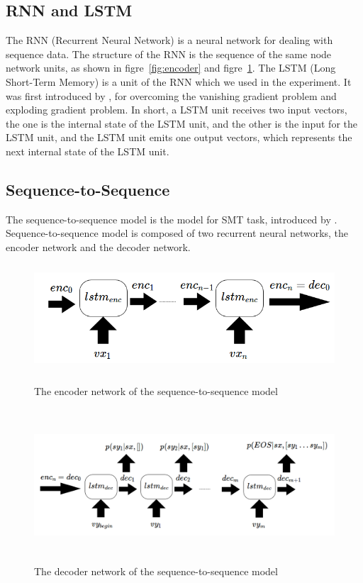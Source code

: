 \documentclass[senior,final,11pt]{iscs-thesis}
\begin{document}
\subsection{RNN and LSTM}
The RNN (Recurrent Neural Network) is a neural network for dealing with sequence data.
The structure of the RNN is the sequence of the same node network units, as shown in figre~\ref{fig:encoder} and figre~\ref{fig:decoder}. 
The LSTM (Long Short-Term Memory) is a unit of the RNN which we used in the experiment. 
It was first introduced by \citet{first_LSTM}, for overcoming the vanishing gradient problem and exploding gradient problem.
In short, a LSTM unit receives two input vectors, 
the one is the internal state of the LSTM unit, and the other is the input for the LSTM unit, 
and the LSTM unit emits one output vectors, which represents the next internal state of the LSTM unit.

\subsection{Sequence-to-Sequence}


The sequence-to-sequence model is the model for SMT task, introduced by \citet{seq2seq}.
Sequence-to-sequence model is composed of two recurrent neural networks, the encoder network and the decoder network.

\begin{figure}[]
	\begin{center}
	\includegraphics[height=4cm]{encoder.png}
	\end{center}
	\caption{The encoder network of the sequence-to-sequence model}
	\label{fig:encoder}
	\begin{center}
	\includegraphics[height=5.7cm]{decoder.png}
	\end{center}
	\caption{ The decoder network of the sequence-to-sequence model}
	\label{fig:decoder}
\end{figure}
\end{document}
